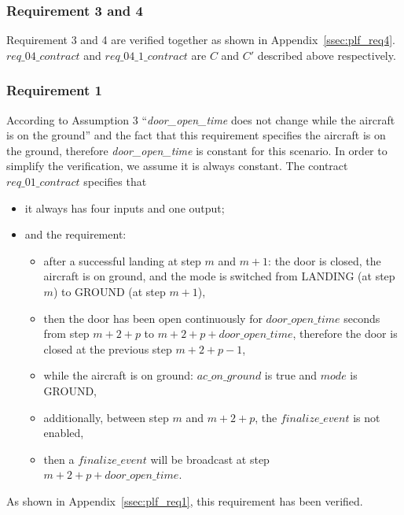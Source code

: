 \subsubsection{Requirement 3 and 4}
Requirement 3 and 4 are verified together as shown in Appendix~\ref{ssec:plf_req4}. $req\_04\_contract$ and $req\_04\_1\_contract$ are $C$ and $C'$ described above respectively. 

\subsubsection{Requirement 1}
According to Assumption 3 ``\emph{door\_open\_time} does not change while the aircraft is on the ground'' and the fact that this requirement specifies the aircraft is on the ground, therefore \emph{door\_open\_time} is constant for this scenario. In order to simplify the verification, we assume it is always constant. The contract $req\_01\_contract$ specifies that 
\begin{itemize}
  \item it always has four inputs and one output;
  \item and the requirement: 
     \begin{itemize}
        \item after a successful landing at step $m$ and $m+1$: the door is closed, the aircraft is on ground, and the mode is switched from LANDING (at step $m$) to GROUND (at step $m+1$),
        \item then the door has been open continuously for $door\_open\_time$ seconds from step $m+2+p$ to $m+2+p+door\_open\_time$, therefore the door is closed at the previous step $m+2+p-1$,
        \item while the aircraft is on ground: $ac\_on\_ground$ is true and $mode$ is GROUND,
        \item additionally, between step $m$ and $m+2+p$, the $finalize\_event$ is not enabled,
        \item then a $finalize\_event$ will be broadcast at step $m+2+p+door\_open\_time$.
     \end{itemize}
\end{itemize}

As shown in Appendix~\ref{ssec:plf_req1}, this requirement has been verified.

